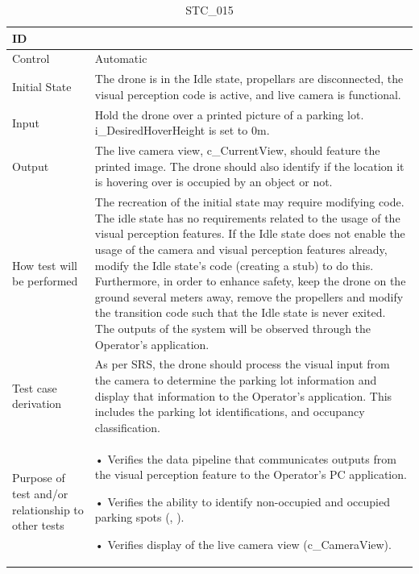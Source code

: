 \documentclass[12pt, titlepage]{article}
\begin{document}
\begin{table}[!h]
\begin{center}
\caption {STC\_015}
\label{tab:STC_015}
\begin{tabular}{ | m{1.5cm} | m{15cm} | } 
\hline
ID & \nameref{tab:STC_015} \\ 
\hline
Control & Automatic \\ 
\hline
Initial State & The drone is in the Idle state, propellars are disconnected, the visual perception code is active, and live camera is functional.
\\ 
\hline
Input & Hold the drone over a printed picture of a parking lot. i\_DesiredHoverHeight is set to 0m. \\ 
\hline
Output & The live camera view, c\_CurrentView, should feature the printed image. The drone should also identify if the location it is hovering over is occupied by an object or not.   \\ 
\hline
How test will be performed & The recreation of the initial state may require modifying code. The idle state has no requirements related to the usage of the visual perception features. If the Idle state does not enable the usage of the camera and visual perception features already, modify the Idle state's code (creating a stub) to do this. Furthermore, in order to enhance safety, keep the drone on the ground several meters away, remove the propellers and modify the transition code such that the Idle state is never exited. The outputs of the system will be observed through the Operator's application.  \\ 
\hline
Test case derivation & As per SRS, the drone should process the visual input from the camera to determine the parking lot information and display that information to the Operator's application. This includes the parking lot identifications, and occupancy classification.  \\ 
\hline
Purpose of test and/or relationship to other tests &  • Verifies the data pipeline that communicates outputs from the visual perception feature to the Operator's PC application.

• Verifies the ability to identify non-occupied and occupied parking spots (\nameref{GEN_005}, \nameref{SR_009}).

• Verifies display of the live camera view (c\_CameraView). \\ 
\hline
\end{tabular}
\end{center}
\end{table}
\end{document}

